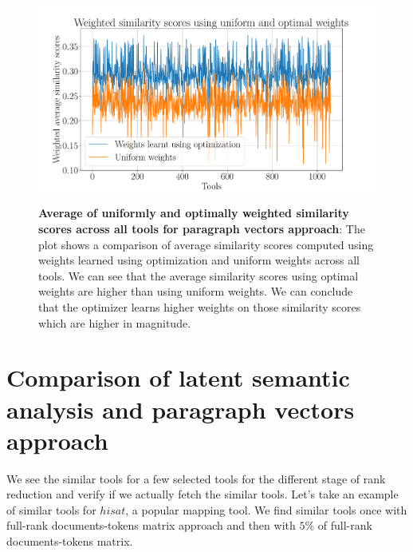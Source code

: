 \begin{figure}[h]
\begin{centering}
    {\includegraphics[scale=0.45]{figures/weighted_optimal_uniform_scores.pdf}}
    \caption[Average of uniformly and optimally weighted similarity scores across all tools for paragraph vectors approach]{\textbf{Average of uniformly and optimally weighted similarity scores across all tools for paragraph vectors approach}: The plot shows a comparison of average similarity scores computed using weights learned using optimization and uniform weights across all tools. We can see that the average similarity scores using optimal weights are higher than using uniform weights. We can conclude that the optimizer learns higher weights on those similarity scores which are higher in magnitude.}
\end{centering}
\end{figure}

\section{Comparison of latent semantic analysis and paragraph vectors approach}
We see the similar tools for a few selected tools for the different stage of rank reduction and verify if we actually fetch the similar tools. Let's take an example of similar tools for $hisat$, a popular mapping tool. We find similar tools once with full-rank documents-tokens matrix approach and then with $5\%$ of full-rank documents-tokens matrix.

